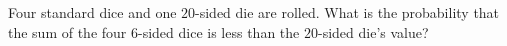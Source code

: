 Four standard dice and one $20$-sided die are rolled. What is the probability that the sum of the four $6$-sided dice is less than the $20$-sided die's value?
